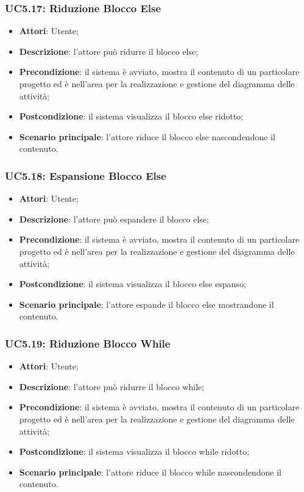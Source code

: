 \subsubsection{UC5.17: Riduzione Blocco Else}
\label{UC5.17}
\begin{itemize}
	\item \textbf{Attori}: Utente;
	\item \textbf{Descrizione}: l'attore può ridurre il blocco else;
	\item \textbf{Precondizione}: il sistema è avviato, mostra il contenuto di un particolare progetto ed è nell'area per la realizzazione e gestione del diagramma delle attività;
	\item \textbf{Postcondizione}: il sistema visualizza il blocco else ridotto;
	\item \textbf{Scenario principale}: l'attore riduce il blocco else nascondendone il contenuto.
\end{itemize}

\subsubsection{UC5.18: Espansione Blocco Else}
\label{UC5.18}
\begin{itemize}
	\item \textbf{Attori}: Utente;
	\item \textbf{Descrizione}: l'attore può espandere il blocco else;
	\item \textbf{Precondizione}: il sistema è avviato, mostra il contenuto di un particolare progetto ed è nell'area per la realizzazione e gestione del diagramma delle attività;
	\item \textbf{Postcondizione}: il sistema visualizza il blocco else espanso;
	\item \textbf{Scenario principale}: l'attore espande il blocco else mostrandone il contenuto.
\end{itemize}

\subsubsection{UC5.19: Riduzione Blocco While}
\label{UC5.19}
\begin{itemize}
	\item \textbf{Attori}: Utente;
	\item \textbf{Descrizione}: l'attore può ridurre il blocco while;
	\item \textbf{Precondizione}: il sistema è avviato, mostra il contenuto di un particolare progetto ed è nell'area per la realizzazione e gestione del diagramma delle attività;
	\item \textbf{Postcondizione}: il sistema visualizza il blocco while ridotto;
	\item \textbf{Scenario principale}: l'attore riduce il blocco while nascondendone il contenuto.
\end{itemize}

